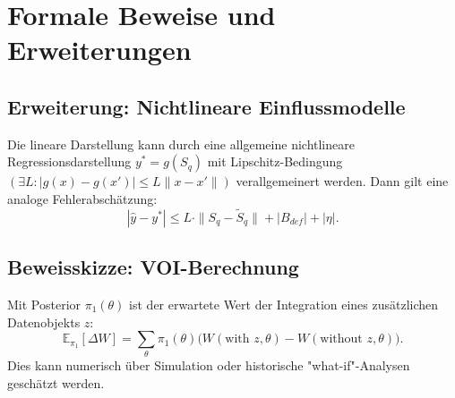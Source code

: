 \documentclass[a4paper,12pt]{article}
\theoremstyle{definition}
\newcommand{\E}{\mathbb{E}}
\begin{document}
\section{Formale Beweise und Erweiterungen}
\subsection{Erweiterung: Nichtlineare Einflussmodelle}
Die lineare Darstellung kann durch eine allgemeine nichtlineare Regressionsdarstellung $y^*=g(S_q)$ mit Lipschitz-Bedingung $(\exists L: |g(x)-g(x')|\le L\|x-x'\|)$ verallgemeinert werden. Dann gilt eine analoge Fehlerabschätzung:
\[
|\hat y-y^*| \le L\cdot \|S_q-\tilde S_q\| + |B_{def}| + |\eta|.
\]

\subsection{Beweisskizze: VOI-Berechnung}
Mit Posterior $\pi_1(\theta)$ ist der erwartete Wert der Integration eines zusätzlichen Datenobjekts $z$:
\[
\E_{\pi_1}[\Delta W] = \sum_{\theta} \pi_1(\theta) \big( W(\text{with }z,\theta)-W(\text{without }z,\theta)\big).
\]
Dies kann numerisch über Simulation oder historische "what-if"-Analysen geschätzt werden.
\end{document}
